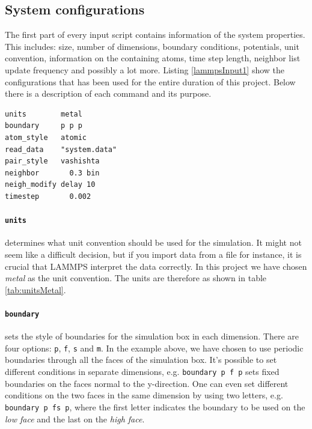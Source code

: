 \documentclass[twoside,english]{uiofysmaster}
\begin{document}
\subsection{System configurations} \label{sec:systemConfigurations}
The first part of every input script contains information of the system properties. This includes: size, number of dimensions, boundary conditions, potentials, unit convention, information on the containing atoms, time step length, neighbor list update frequency and possibly a lot more.   
Listing \ref{lammpsInput1} show the configurations that has been used for the entire duration of this project. 
Below there is a description of each command and its purpose.


\begin{lstlisting}[language=LammpsInput, caption={Typical system configurations applied in this project.}, label={lammpsInput1}]
units        metal
boundary     p p p
atom_style   atomic
read_data    "system.data"
pair_style   vashishta
neighbor	   0.3 bin
neigh_modify delay 10
timestep	   0.002
\end{lstlisting} 

\paragraph{\texttt{units}} determines what unit convention should be used for the simulation. It might not seem like a difficult decision, but if you import data from a file for instance, it is crucial that LAMMPS interpret the data correctly. In this project we have chosen \textit{metal} as the unit convention. The units are therefore as shown in table \ref{tab:unitsMetal}.

\paragraph{\texttt{boundary}}  sets the style of boundaries for the simulation box in each dimension. There are four options: \texttt{p}, \texttt{f}, \texttt{s} and \texttt{m}. In the example above, we have chosen to use periodic boundaries through all the faces of the simulation box. It's possible to set different conditions in separate dimensions, e.g. \texttt{boundary   p f p} sets fixed boundaries on the faces normal to the y-direction.  One can even set different conditions on the two faces in the same dimension by using two letters, e.g.   \texttt{boundary   p fs p}, where the first letter indicates the boundary to be used on the \textit{low face} and the last on the \textit{high face}. 
\end{document}
